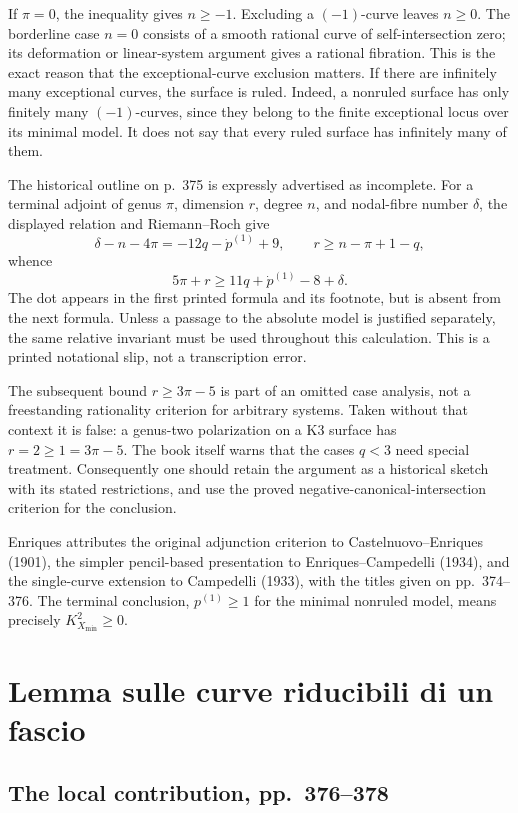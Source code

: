 If $\pi=0$, the inequality gives $n\geq-1$. Excluding a $(-1)$-curve leaves $n\geq0$. The borderline case $n=0$ consists of a smooth rational curve of self-intersection zero; its deformation or linear-system argument gives a rational fibration. This is the exact reason that the exceptional-curve exclusion matters. If there are infinitely many exceptional curves, the surface is ruled. Indeed, a nonruled surface has only finitely many $(-1)$-curves, since they belong to the finite exceptional locus over its minimal model. It does not say that every ruled surface has infinitely many of them.

The historical outline on p.~375 is expressly advertised as incomplete. For a terminal adjoint of genus $\pi$, dimension $r$, degree $n$, and nodal-fibre number $\delta$, the displayed relation and Riemann--Roch give
\[
 \delta-n-4\pi=-12q-\dot p^{(1)}+9,
 \qquad r\geq n-\pi+1-q,
\]
whence
\[
 5\pi+r\geq11q+\dot p^{(1)}-8+\delta.
\]
The dot appears in the first printed formula and its footnote, but is absent from the next formula. Unless a passage to the absolute model is justified separately, the same relative invariant must be used throughout this calculation. This is a printed notational slip, not a transcription error.

The subsequent bound $r\geq3\pi-5$ is part of an omitted case analysis, not a freestanding rationality criterion for arbitrary systems. Taken without that context it is false: a genus-two polarization on a K3 surface has $r=2\geq1=3\pi-5$. The book itself warns that the cases $q<3$ need special treatment. Consequently one should retain the argument as a historical sketch with its stated restrictions, and use the proved negative-canonical-intersection criterion for the conclusion.

Enriques attributes the original adjunction criterion to Castelnuovo--Enriques (1901), the simpler pencil-based presentation to Enriques--Campedelli (1934), and the single-curve extension to Campedelli (1933), with the titles given on pp.~374--376. The terminal conclusion, $p^{(1)}\geq1$ for the minimal nonruled model, means precisely $K_{X_{\min}}^2\geq0$.

\section{Lemma sulle curve riducibili di un fascio}
\label{cp2-x-3}

\subsection{The local contribution, pp.~376--378}


